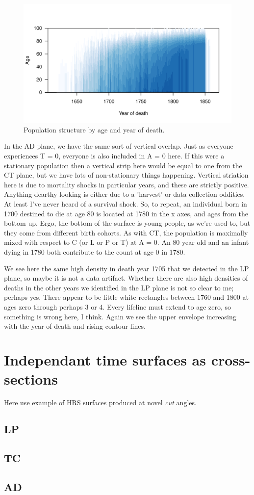 \begin{figure}
\includegraphics[scale=.9]{Figures/QuebecAD.pdf}
\caption{Population structure by age and year of death.}
\label{fig:adq}
\end{figure}
In the AD plane, we have the same sort of vertical overlap. Just as everyone
experiences T = 0, everyone is also included in A = 0 here. If this were a stationary population then a vertical strip here would be equal to one from the CT plane, but we have lots of non-stationary things happening. Vertical striation here is due to mortality shocks in particular years, and these are strictly positive. Anything dearthy-looking is either due to a 'harvest' or data collection oddities. At least I've never heard of a survival shock. So, to repeat, an individual born in 1700 destined to die at age 80 is located at 1780 in the x axes, and ages from the bottom up. Ergo, the bottom of the surface is young people, as we're used to, but they come from different birth cohorts. As with CT, the population is maximally mixed with respect to C (or L or P or T) at A = 0. An 80 year old and an infant dying in 1780 both contribute to the count at age 0 in 1780.

We see here the same high density in death year 1705 that we detected in the LP
plane, so maybe it is not a data artifact. Whether there are also high densities of deaths in the other years we identified in the LP plane is not so clear to me; perhaps yes. There appear to be little white rectangles between 1760 and 1800 at ages zero through perhaps 3 or 4. Every lifeline must extend to age zero, so something is wrong here, I think. Again we see the upper envelope increasing with the year of death and rising contour lines.

\section{Independant time surfaces as cross-sections}
Here use example of HRS surfaces produced at novel \emph{cut} angles.
\subsection{LP}

\subsection{TC}


\subsection{AD}


  


